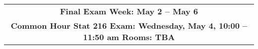 \begin{center}
\begin{tabular}{|c|c|}
  \multicolumn{2}{|c|}{\textbf{Final Exam Week: May 2 -- May 6 }} \\
  \multicolumn{2}{|c|}{\bf{ Common Hour Stat 216  Exam: 
      Wednesday, May 4, 10:00 -- 11:50 am Rooms: TBA}} \\
\hline

\end{tabular}
\vspace{.2in} \\
\end{center}


